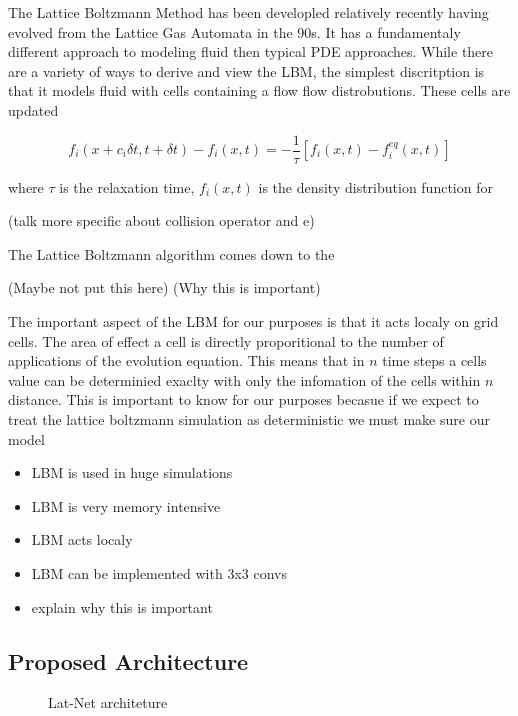\documentclass{article}
\begin{document}
The Lattice Boltzmann Method has been developled relatively recently having evolved from the Lattice Gas Automata in the 90s. It has a fundamentaly different approach to modeling fluid then typical PDE approaches. While there are a variety of ways to derive and view the LBM, the simplest discritption is that it models fluid with cells containing a flow flow distrobutions. These cells are updated 

\begin{equation}
  f_i(x+c_i \delta{t}, t+ \delta{t}) - f_i(x,t) = -\frac{1}{\tau} [f_i(x,t) - f_i^{eq}(x,t)]
\end{equation}

where $\tau$ is the relaxation time, $f_i(x,t)$ is the density distribution function for

(talk more specific about collision operator and e)

The Lattice Boltzmann algorithm comes down to the 

(Maybe not put this here)
(Why this is important)

The important aspect of the LBM for our purposes is that it acts localy on grid cells. The area of effect a cell is directly proporitional to the number of applications of the evolution equation. This means that in $n$ time steps a cells value can be determinied exaclty with only the infomation of the cells within $n$ distance. This is important to know for our purposes becasue if we expect to treat the lattice boltzmann simulation as deterministic we must make sure our model 

\begin{itemize}
  \item LBM is used in huge simulations
  \item LBM is very memory intensive
  \item LBM acts localy
  \item LBM can be implemented with 3x3 convs
  \item explain why this is important
\end{itemize}

\subsection{Proposed Architecture}

\begin{figure}[!t]
\centering
{}
\caption{Lat-Net architeture }
\label{fig_1}
\end{figure}
\end{document}
